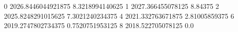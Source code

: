 0 2026.8446044921875 8.3218994140625
1 2027.366455078125 8.84375
2 2025.8248291015625 7.3021240234375
4 2021.332763671875 2.81005859375
6 2019.2747802734375 0.7520751953125
8 2018.522705078125 0.0

